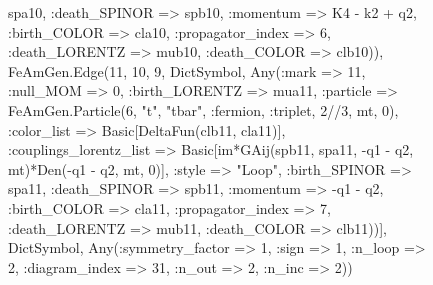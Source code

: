 \documentclass{revtex4}
\begin{document}
\begin{figure}[!htb]
\begin{center}
{spa10, :death_SPINOR => spb10, :momentum => K4 - k2 + q2, :birth_COLOR => cla10, :propagator_index => 6, :death_LORENTZ => mub10, :death_COLOR => clb10)), FeAmGen.Edge(11, 10, 9, Dict{Symbol, Any}(:mark => 11, :null_MOM => 0, :birth_LORENTZ => mua11, :particle => FeAmGen.Particle(6, "t", "tbar", :fermion, :triplet, 2//3, mt, 0), :color_list => Basic[DeltaFun(clb11, cla11)], :couplings_lorentz_list => Basic[im*GAij(spb11, spa11, -q1 - q2, mt)*Den(-q1 - q2, mt, 0)], :style => "Loop", :birth_SPINOR => spa11, :death_SPINOR => spb11, :momentum => -q1 - q2, :birth_COLOR => cla11, :propagator_index => 7, :death_LORENTZ => mub11, :death_COLOR => clb11))], Dict{Symbol, Any}(:symmetry_factor => 1, :sign => 1, :n_loop => 2, :diagram_index => 31, :n_out => 2, :n_inc => 2)) 
}
\end{center}
\end{figure}
\end{document}
